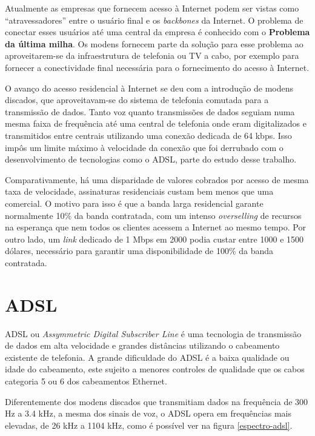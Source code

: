 \documentclass[brazil,times,12pt]{abnt}
\begin{document}
Atualmente as empresas que fornecem acesso à Internet podem ser vistas como
``atravessadores'' entre o usuário final e os \emph{backbones} da Internet. O
problema de conectar esses usuários até uma central da empresa é conhecido com o
\textbf{Problema da última milha}. Os modens fornecem parte da solução para esse
problema ao aproveitarem-se da infraestrutura de telefonia ou TV a cabo, por
exemplo para fornecer a conectividade final necessária para o fornecimento do
acesso à Internet. \cite{abusar:ultima-milha}

O avanço do acesso residencial à Internet se deu com a introdução de modens
discados, que aproveitavam-se do sistema de telefonia comutada para a transmissão de dados.
Tanto voz quanto transmissões de dados seguiam numa mesma faixa de frequência
até uma central de telefonia onde eram digitalizados e transmitidos entre centrais
utilizando uma conexão dedicada de 64 kbps. \cite{morimoto:opcoes-acesso} Isso
impôs um limite máximo à velocidade da conexão que foi derrubado com o
desenvolvimento de tecnologias como o ADSL, parte do estudo desse
trabalho.

Comparativamente, há uma disparidade de valores cobrados por acesso de mesma
taxa de velocidade, assinaturas residenciais custam bem menos que uma comercial.
O motivo para isso é que a banda larga residencial
garante normalmente 10\% da banda contratada, com um intenso
\emph{overselling} de recursos na esperança que nem todos os clientes acessem a
Internet ao mesmo tempo. Por outro lado, um \emph{link} dedicado de 1 Mbps em
2000 podia custar entre 1000 e 1500 dólares, necessário para garantir uma
disponibilidade de 100\% da banda contratada. \cite{hsw:t1}

\section*{ADSL}
ADSL ou \emph{Assymmetric Digital Subscriber Line} é uma tecnologia de
transmissão de dados em alta velocidade e grandes distâncias utilizando o
cabeamento existente de telefonia. A grande dificuldade do ADSL é a baixa
qualidade ou idade do cabeamento, este sujeito a menores controles de qualidade
que os cabos categoria 5 ou 6 dos cabeamentos Ethernet.

Diferentemente dos modens discados que transmitiam dados na frequência de 300 Hz
a 3.4 kHz, a mesma dos sinais de voz, o ADSL opera em frequências mais elevadas,
de 26 kHz a 1104 kHz, como é possível ver na figura \ref{espectro-adsl}.
\end{document}
